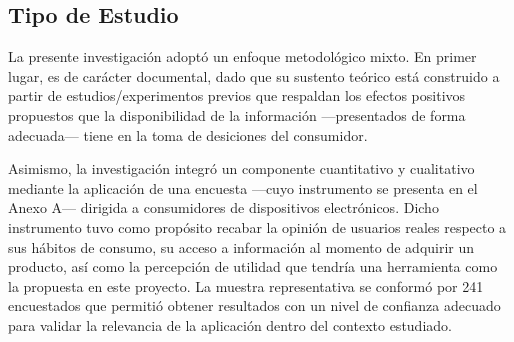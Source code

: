 \subsection{Tipo de Estudio}

La presente investigación adoptó un enfoque metodológico mixto. En primer lugar,
es de carácter documental, dado que su sustento teórico está construido a partir de
estudios/experimentos previos que respaldan los efectos positivos propuestos que
la disponibilidad de la información —presentados de forma adecuada— tiene 
en la toma de desiciones del consumidor.

Asimismo, la investigación integró un componente cuantitativo
y cualitativo mediante la aplicación de una encuesta —cuyo instrumento se
presenta en el Anexo A— dirigida a consumidores de dispositivos electrónicos.
Dicho instrumento tuvo como propósito recabar la opinión de usuarios reales
respecto a sus hábitos de consumo, su acceso a información al momento de
adquirir un producto, así como la percepción de utilidad que tendría una herramienta
como la propuesta en este proyecto. La muestra representativa se conformó por
241 encuestados que permitió obtener resultados con un nivel de confianza 
adecuado para validar la relevancia de la aplicación dentro del contexto estudiado.
